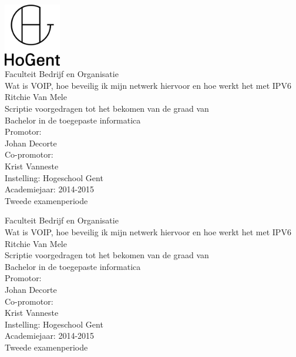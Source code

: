 \documentclass[pdftex,a4paper,12pt,twoside]{report}
\newcommand{\emptypage}{
\newpage
\thispagestyle{empty}
\mbox{}
\newpage
}
\newcommand{\student}{Ritchie Van Mele}
\newcommand{\promotor}{Johan Decorte}
\newcommand{\copromotor}{Krist Vanneste}
\newcommand{\instelling}{Hogeschool Gent}
\newcommand{\titel}{Wat is VOIP, hoe beveilig ik mijn netwerk hiervoor en hoe werkt het met IPV6}
\newcommand{\faculteit}{Faculteit Bedrijf en Organisatie}
\newcommand{\rapporttype}{Scriptie voorgedragen tot het bekomen van de graad van\\Bachelor in de toegepaste informatica}
\newcommand{\academiejaar}{2014-2015}
\newcommand{\examenperiode}{Tweede examenperiode}
\begin{document}

\begin{titlepage}
  \begin{center}

    \begingroup
    \rmfamily
    \includegraphics[width=2.5cm]{img/HG-beeldmerk-woordmerk}\\[.5cm]
    \faculteit\\[3cm]
    \titel
    \vfill
    \student\\[3.5cm]
    \rapporttype\\[2cm]
    Promotor:\\
    \promotor\\
    Co-promotor:\\
    \copromotor\\[2.5cm]
    Instelling: \instelling\\[.5cm]
    Academiejaar: \academiejaar\\[.5cm]
    \examenperiode
    \endgroup

  \end{center}
  \restoregeometry
\end{titlepage}


\emptypage


\begin{titlepage}
  \begin{center}

    \begingroup
    \rmfamily
    \faculteit\\[3cm]
    \titel
    \vfill
    \student\\[3.5cm]
    \rapporttype\\[2cm]
    Promotor:\\
    \promotor\\
    Co-promotor:\\
    \copromotor\\[2.5cm]
    Instelling: \instelling\\[.5cm]
    Academiejaar: \academiejaar\\[.5cm]
    \examenperiode
    \endgroup

  \end{center}
  \restoregeometry
\end{titlepage}
\end{document}
